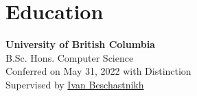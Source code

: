 \section{Education}
\textbf{University of British Columbia} \\
B.Sc. Hons. Computer Science \\
Conferred on May 31, 2022 with Distinction \\
Supervised by \href{https://www.cs.ubc.ca/~bestchai/}{Ivan Beschastnikh}